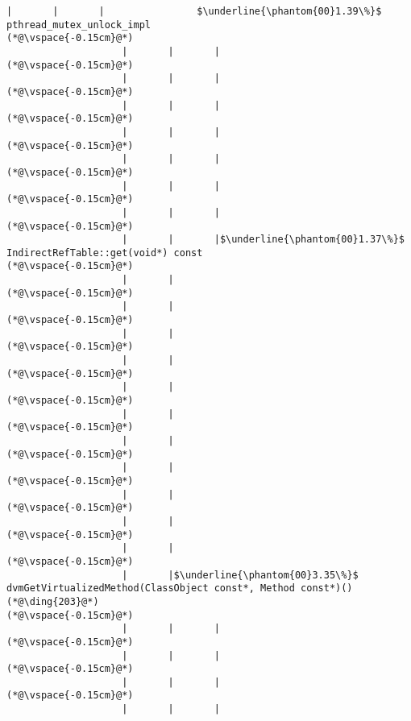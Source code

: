 \begin{lstlisting}[caption=Metodikutsu C$\to$Java 20 int-parametrilla, label=profile:C2JBenchmark00146, numberbychapter=true, frame=lines, float, floatplacement=t]
                    |       |       |                $\underline{\phantom{00}1.39\%}$ pthread_mutex_unlock_impl
(*@\vspace{-0.15cm}@*)
                    |       |       |        
(*@\vspace{-0.15cm}@*)
                    |       |       |       
(*@\vspace{-0.15cm}@*)
                    |       |       |
(*@\vspace{-0.15cm}@*)
                    |       |       |
(*@\vspace{-0.15cm}@*)
                    |       |       |
(*@\vspace{-0.15cm}@*)
                    |       |       |
(*@\vspace{-0.15cm}@*)
                    |       |       |
(*@\vspace{-0.15cm}@*)
                    |       |       |$\underline{\phantom{00}1.37\%}$ IndirectRefTable::get(void*) const
(*@\vspace{-0.15cm}@*)
                    |       |
(*@\vspace{-0.15cm}@*)
                    |       |
(*@\vspace{-0.15cm}@*)
                    |       |
(*@\vspace{-0.15cm}@*)
                    |       |
(*@\vspace{-0.15cm}@*)
                    |       |
(*@\vspace{-0.15cm}@*)
                    |       |
(*@\vspace{-0.15cm}@*)
                    |       |
(*@\vspace{-0.15cm}@*)
                    |       |
(*@\vspace{-0.15cm}@*)
                    |       |
(*@\vspace{-0.15cm}@*)
                    |       |
(*@\vspace{-0.15cm}@*)
                    |       |
(*@\vspace{-0.15cm}@*)
                    |       |$\underline{\phantom{00}3.35\%}$ dvmGetVirtualizedMethod(ClassObject const*, Method const*)() (*@\ding{203}@*)
(*@\vspace{-0.15cm}@*)
                    |       |       |
(*@\vspace{-0.15cm}@*)
                    |       |       |
(*@\vspace{-0.15cm}@*)
                    |       |       |
(*@\vspace{-0.15cm}@*)
                    |       |       |

\end{lstlisting}
